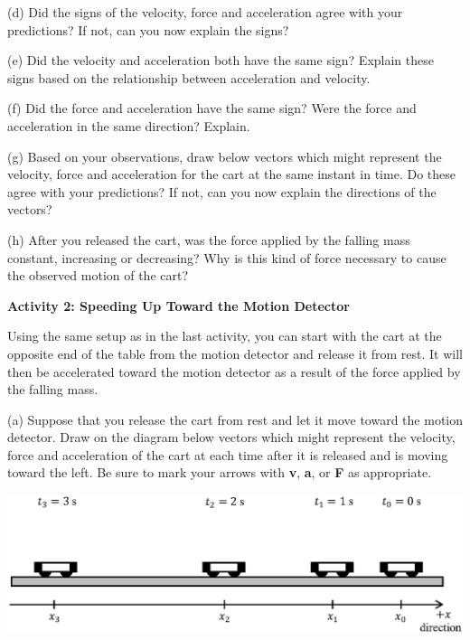 (d) Did the signs of the velocity, force and acceleration agree with your predictions?
If not, can you now explain the signs?
\answerspace{20mm}

\pagebreak[2]
(e) Did the velocity and acceleration both have the same sign? Explain these
signs based on the relationship between acceleration and velocity.
\answerspace{20mm}

(f) Did the force and acceleration have the same sign? Were the force and acceleration
in the same direction? Explain.
\answerspace{20mm}

(g) Based on your observations, draw below vectors which might represent the
velocity, force and acceleration for the cart at the same instant in time. Do
these agree with your predictions? If not, can you now explain the directions
of the vectors?
\answerspace{20mm}

(h) After you released the cart, was the force applied by the falling mass constant,
increasing or decreasing?  Why is this kind of force necessary to cause
the observed motion of the cart?
\answerspace{20mm}

\textbf{Activity 2: Speeding Up Toward the Motion Detector }

Using the same setup as in the last activity, you can start with the cart at
the opposite end of the table from the motion detector and release it from rest.
It will then be accelerated toward the motion detector as a result of the force
applied by the falling mass.

(a) Suppose that you release the cart from rest and let it move toward the motion
detector. Draw on the diagram below vectors which might represent the velocity,
force and acceleration of the cart at each time after it is released and is
moving toward the left. Be sure to mark your arrows with \textbf{v}, \textbf{a},
or \textbf{F} as appropriate.

\vspace{0.3cm}
{\par\centering \includegraphics{force2/carts_speeding.eps} \par}

